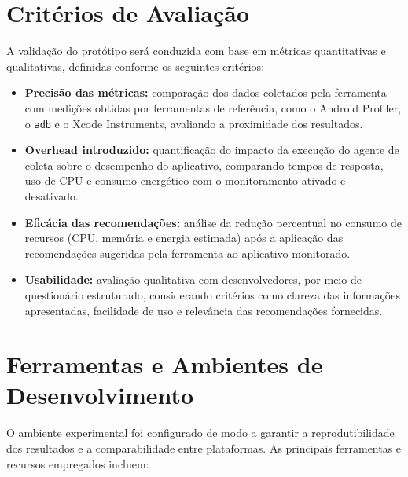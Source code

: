 \documentclass[12pt,a4paper,oneside]{abntex2}
\begin{document}
\section{Critérios de Avaliação}

A validação do protótipo será conduzida com base em métricas quantitativas e qualitativas, definidas conforme os seguintes critérios:

\begin{itemize}
  \item \textbf{Precisão das métricas:} comparação dos dados coletados pela ferramenta com medições obtidas por ferramentas de referência, como o Android Profiler, o \texttt{adb} e o Xcode Instruments, avaliando a proximidade dos resultados. 
  
  \item \textbf{Overhead introduzido:} quantificação do impacto da execução do agente de coleta sobre o desempenho do aplicativo, comparando tempos de resposta, uso de CPU e consumo energético com o monitoramento ativado e desativado. 
  
  \item \textbf{Eficácia das recomendações:} análise da redução percentual no consumo de recursos (CPU, memória e energia estimada) após a aplicação das recomendações sugeridas pela ferramenta ao aplicativo monitorado. 
  
  \item \textbf{Usabilidade:} avaliação qualitativa com desenvolvedores, por meio de questionário estruturado, considerando critérios como clareza das informações apresentadas, facilidade de uso e relevância das recomendações fornecidas.
\end{itemize}
\section{Ferramentas e Ambientes de Desenvolvimento}

O ambiente experimental foi configurado de modo a garantir a reprodutibilidade dos resultados e a comparabilidade entre plataformas. As principais ferramentas e recursos empregados incluem:
\end{document}
